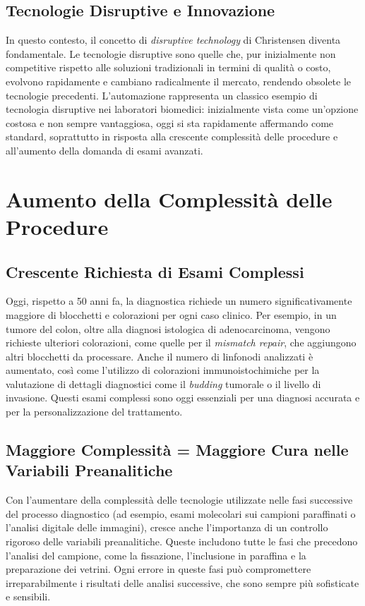 \subsection{Tecnologie Disruptive e Innovazione}

In questo contesto, il concetto di \textit{disruptive technology} di Christensen diventa fondamentale. Le tecnologie disruptive sono quelle che, pur inizialmente non competitive rispetto alle soluzioni tradizionali in termini di qualità o costo, evolvono rapidamente e cambiano radicalmente il mercato, rendendo obsolete le tecnologie precedenti. L'automazione rappresenta un classico esempio di tecnologia disruptive nei laboratori biomedici: inizialmente vista come un'opzione costosa e non sempre vantaggiosa, oggi si sta rapidamente affermando come standard, soprattutto in risposta alla crescente complessità delle procedure e all'aumento della domanda di esami avanzati.

\section{Aumento della Complessità delle Procedure}

\subsection{Crescente Richiesta di Esami Complessi}

Oggi, rispetto a 50 anni fa, la diagnostica richiede un numero significativamente maggiore di blocchetti e colorazioni per ogni caso clinico. Per esempio, in un tumore del colon, oltre alla diagnosi istologica di adenocarcinoma, vengono richieste ulteriori colorazioni, come quelle per il \textit{mismatch repair}, che aggiungono altri blocchetti da processare. Anche il numero di linfonodi analizzati è aumentato, così come l'utilizzo di colorazioni immunoistochimiche per la valutazione di dettagli diagnostici come il \textit{budding} tumorale o il livello di invasione. Questi esami complessi sono oggi essenziali per una diagnosi accurata e per la personalizzazione del trattamento.

\subsection{Maggiore Complessità = Maggiore Cura nelle Variabili Preanalitiche}

Con l'aumentare della complessità delle tecnologie utilizzate nelle fasi successive del processo diagnostico (ad esempio, esami molecolari sui campioni paraffinati o l'analisi digitale delle immagini), cresce anche l'importanza di un controllo rigoroso delle variabili preanalitiche. Queste includono tutte le fasi che precedono l'analisi del campione, come la fissazione, l'inclusione in paraffina e la preparazione dei vetrini. Ogni errore in queste fasi può compromettere irreparabilmente i risultati delle analisi successive, che sono sempre più sofisticate e sensibili.

